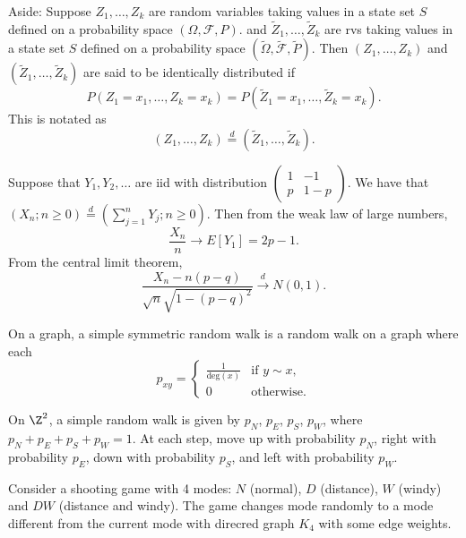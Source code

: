 \begin{examples}
    Aside: Suppose $Z_1, \dots, Z_k$ are random variables taking values in a
    state set $S$ defined on a probability space $(\Omega, \mathcal F, P)$.
    and $\tilde{Z}_1, \dots, \tilde{Z}_k$ are rvs taking values in a
    state set $S$ defined on a probability space
    $(\tilde{\Omega}, \tilde{\mathcal F}, \tilde{P})$.
    Then $(Z_1, \dots, Z_k)$ and $(\tilde{Z}_1, \dots, \tilde{Z}_k)$ are said to
    be identically distributed if \[
        P(Z_1 = x_1, \dots, Z_k = x_k)
        = P(\tilde{Z}_1 = x_1, \dots, \tilde{Z}_k = x_k).
    \] This is notated as \[
        (Z_1, \dots, Z_k) \stackrel{d}{=} (\tilde{Z}_1, \dots, \tilde{Z}_k).
    \]

    Suppose that $Y_1, Y_2, \dots$ are iid with distribution
    $\begin{pmatrix}
        1 & -1 \\
        p & 1-p
    \end{pmatrix}$.
    We have that $(X_n; n \ge 0) \stackrel{d}{=} (\sum_{j=1}^{n} Y_j; n \ge 0)$.
    Then from the weak law of large numbers, \[
        \frac{X_n}{n} \to E[Y_1] = 2p - 1.
    \] From the central limit theorem, \[
        \frac{X_n - n(p - q)}{\sqrt{n} \sqrt{1 - (p-q)^2}} \stackrel{d}{\to}
        N(0, 1).
    \]

    On a graph, a simple symmetric random walk is a random walk on a graph
    where each \[
        p_{xy} = \begin{cases}
            \frac1{\mathrm{deg}(x)} & \text{if } y \sim x, \\
            0 & \text{otherwise}.
        \end{cases}
    \]

    On $\Z^2$, a simple random walk is given by $p_N$, $p_E$, $p_S$, $p_W$,
    where $p_N + p_E + p_S + p_W = 1$.
    At each step, move up with probability $p_N$, right with probability $p_E$,
    down with probability $p_S$, and left with probability $p_W$.

    \item Consider a shooting game with 4 modes: $N$ (normal), $D$ (distance),
    $W$ (windy) and $DW$ (distance and windy).
    The game changes mode randomly to a mode different from the current mode
    with direcred graph $K_4$ with some edge weights.
\end{examples}

